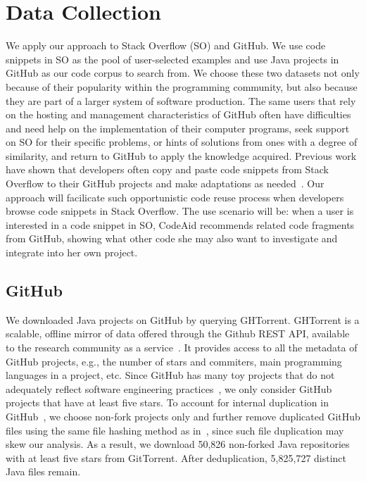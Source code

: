 \section{Data Collection}
\label{sec:dataset}
We apply our approach to Stack Overflow (SO) and GitHub. We use code snippets in SO as the pool of user-selected examples and use Java projects in GitHub as our code corpus to search from. We choose these two datasets not only because of their popularity within the programming community, but also because they are part of a larger system of software production. The same users that rely on the hosting and management characteristics of GitHub often have difficulties and need help on the implementation of their computer programs, seek support on SO for their specific problems, or hints of solutions from ones with a degree of similarity, and return to GitHub to apply the knowledge acquired. Previous work have shown that developers often copy and paste code snippets from Stack Overflow to their GitHub projects and make adaptations as needed~\cite{yang2017stack, an2017stack, wu2018developers, zhang2019analyzing}. Our approach will facilicate such opportunistic code reuse process when developers browse code snippets in Stack Overflow. The use scenario will be: when a user is interested in a code snippet in SO, CodeAid recommends related code fragments from GitHub, showing what other code she may also want to investigate and integrate into her own project.  


\subsection{GitHub}
We downloaded Java projects on GitHub by querying GHTorrent. GHTorrent is a scalable, offline mirror of data offered through the Github REST API, available to the research community as a service~\cite{gousios2012ghtorrent}. It provides access to all the metadata of GitHub projects, e.g., the number of stars and commiters, main programming languages in a project, etc. Since GitHub has many toy projects that do not adequately reflect software engineering practices~\cite{kalliamvakou2014promises}, we only consider GitHub projects that have at least five stars. To account for internal duplication in GitHub~\cite{lopes2017dejavu}, we choose non-fork projects only and further remove duplicated GitHub files using the same file hashing method as in~\cite{lopes2017dejavu}, since such file duplication may skew our analysis. As a result, we download 50,826 non-forked Java repositories with at least five stars from GitTorrent. After deduplication, 5,825,727 distinct Java files remain.%


